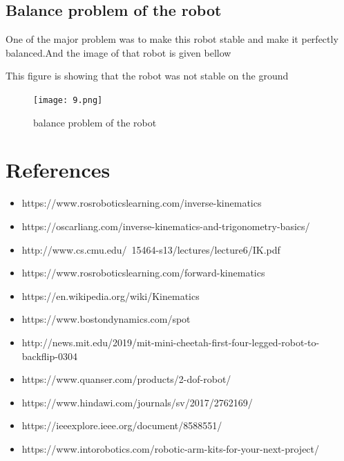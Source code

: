 \documentclass [a4paper ] {report}
\begin{document}
\subsection{Balance problem of the robot}
One of the major problem was to make this robot stable and make it perfectly balanced.And the image of that robot is given bellow

\begin{center}



This figure is showing that the robot was not stable on the ground
\vadjust{\vskip 10mm \vskip 0pt}
\begin{figure}[h]
\begin{center}
\texttt{[image: 9.png]}
\end{center}
  \caption{balance problem of the robot \vadjust{\vskip 10mm \vskip 0pt}}
\label{fig:fig2}
\end{figure}
\end{center}
\hfill \break
 
\newpage




\section{References}


\begin{itemize}
\item https://www.rosroboticslearning.com/inverse-kinematics
\item https://oscarliang.com/inverse-kinematics-and-trigonometry-basics/
\item http://www.cs.cmu.edu/~15464-s13/lectures/lecture6/IK.pdf
\item https://www.rosroboticslearning.com/forward-kinematics

\item https://en.wikipedia.org/wiki/Kinematics
\item https://www.bostondynamics.com/spot
\item http://news.mit.edu/2019/mit-mini-cheetah-first-four-legged-robot-to-backflip-0304

\item https://www.quanser.com/products/2-dof-robot/

\item https://www.hindawi.com/journals/sv/2017/2762169/


\item https://ieeexplore.ieee.org/document/8588551/

\item https://www.intorobotics.com/robotic-arm-kits-for-your-next-project/






\end{itemize}
\end{document}
